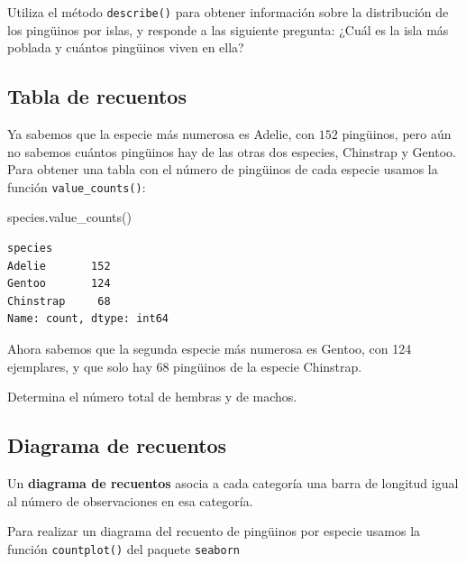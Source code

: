 \documentclass[
  a4paper,
  noprof,
  12pt,
  notoc,
  nosols,
  nobib]{mnye}
\newenvironment{Shaded}{\begin{snugshade}}{\end{snugshade}}
\newcommand{\NormalTok}[1]{\textcolor[rgb]{0.00,0.23,0.31}{#1}}
\renewenvironment{exercise}[1][]{
            \if\relax\detokenize{#1}\relax
                \ex
            \else
                \ex[note={#1}]
            \fi
        }{\endex}
\theoremstyle{definition}
\newtheorem{exercise}{Ejercicio}[section]
\theoremstyle{remark}
\begin{document}
\begin{exercise}[]%
\protect\hypertarget{exr-1categorical-describe}{}\label{exr-1categorical-describe}%
Utiliza el método \texttt{describe()} para obtener información sobre la
distribución de los pingüinos por islas, y responde a las siguiente
pregunta: ¿Cuál es la isla más poblada y cuántos pingüinos viven en
ella?

\end{exercise}

\subsection{Tabla de recuentos}\label{sec-value-counts}

Ya sabemos que la especie más numerosa es Adelie, con \(152\) pingüinos,
pero aún no sabemos cuántos pingüinos hay de las otras dos especies,
Chinstrap y Gentoo. Para obtener una tabla con el número de pingüinos de
cada especie usamos la función \texttt{value\_counts()}:

\begin{Shaded}
\begin{Highlighting}[]
\NormalTok{species.value\_counts()}
\end{Highlighting}
\end{Shaded}

\begin{verbatim}
species
Adelie       152
Gentoo       124
Chinstrap     68
Name: count, dtype: int64
\end{verbatim}

Ahora sabemos que la segunda especie más numerosa es Gentoo, con 124
ejemplares, y que solo hay 68 pingüinos de la especie Chinstrap.

\begin{exercise}[]%
\protect\hypertarget{exr-1categorial-sex-counts}{}\label{exr-1categorial-sex-counts}%
Determina el número total de hembras y de machos.

\end{exercise}

\subsection{Diagrama de recuentos}\label{diagrama-de-recuentos}

Un \textbf{diagrama de recuentos} asocia a cada categoría una barra de
longitud igual al número de observaciones en esa categoría.

Para realizar un diagrama del recuento de pingüinos por especie usamos
la función \texttt{countplot()} del paquete \texttt{seaborn}
\end{document}
